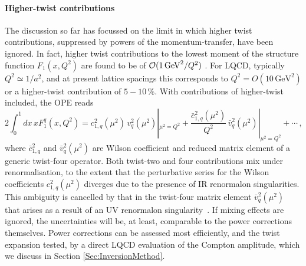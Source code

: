 \paragraph*{Higher-twist contributions} The discussion so far has focussed on the limit in which higher twist contributions, suppressed by powers of the momentum-transfer, have been ignored. In fact, higher twist contributions to the lowest moment of the structure function $F_1(x,Q^2)$ are found to be of ${\cal O}(1\, \mbox{GeV}^2/Q^2)$ \cite{Blumlein:2008kz}. For LQCD, typically $Q^2 \simeq 1/a^2$, and at present lattice spacings this corresponds to $Q^2 = O(10\,\mbox{GeV}^2)$ or a higher-twist contribution of $5 - 10\, \%$. With contributions of higher-twist included, the OPE reads
\begin{equation}
2 \int_0^1 dx\, x F_1^q(x,Q^2) = c_{1,q}^2(\mu^2)\, v_q^2(\mu^2)|_{\mu^2=Q^2} + \frac{\bar{c}_{1,q}^2(\mu^2)}{Q^2}\, \bar{v}_q^2(\mu^2)|_{\mu^2=Q^2} + \cdots \,,
\label{tex}
\end{equation}
where $\bar{c}_{1,q}^2$ and $\bar{v}_q^2(\mu^2)$ are Wilson coefficient and reduced matrix element of a generic twist-four operator. Both twist-two and four contributions mix under renormalisation, to the extent that the perturbative series for the Wilson coefficients $c_{1,q}^2(\mu^2)$ diverges due to the presence of IR renormalon singularities. This ambiguity is cancelled by that in the twist-four matrix element $\bar{v}_q^2(\mu^2)$ that arises as a result of an UV renormalon singularity~\cite{Martinelli:1996pk}. If mixing effects are ignored, the uncertainties will be, at least, comparable to the power corrections themselves. Power corrections can be assessed most efficiently, and the twist expansion tested, by a direct LQCD evaluation of the Compton amplitude, which we discuss in Section \ref{Sec:InversionMethod}.

